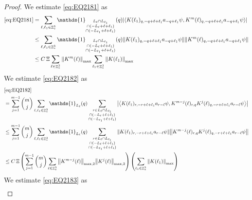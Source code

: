 \documentclass[sn-mathphys, Numbered ,a4paper]{sn-jnl}%
\DeclareMathOperator{\Z}{\mathbb{Z}}
\newcommand{\eva}[1]{\left\langle #1 \right\rangle}
\theoremstyle{plain}
\theoremstyle{definition}
\theoremstyle{remark}
\theoremstyle{plain}
\theoremstyle{definition}
\theoremstyle{remark}
\begin{document}
\begin{proof}
We estimate \eqref{eq:EQ2181} as 
\begin{align}
	 \eqref{eq:EQ2181}
	&= \sum\limits_{\ell, \ell_1\in \Z^3_*} \mathds{1}_{\substack{L_{\ell}\cap L_{\ell_1}\\\cap (-L_{\ell}+\ell+\ell_1) \\ \cap (-L_{\ell_1}+\ell+\ell_1)}}(q) \abs{\eva{ K(\ell_1)_{q,-q+\ell+\ell_1} a_{-q+\ell_1} \psi, K^m(\ell)_{q,-q+\ell+\ell_1} a_{-q+\ell_1} \psi }}\nonumber\\
	&\leq \sum\limits_{\ell, \ell_1\in \Z^3_*} \mathds{1}_{\substack{L_{\ell}\cap L_{\ell_1}\\\cap (-L_{\ell}+\ell+\ell_1) \\ \cap (-L_{\ell_1}+\ell+\ell_1)}}(q) \norm{ K(\ell_1)_{q,-q+\ell+\ell_1} a_{-q+\ell_1} \psi}\norm{ K^m(\ell)_{q,-q+\ell+\ell_1} a_{-q+\ell_1} \psi }\nonumber\\
	&\leq C\,\Xi \sum\limits_{\ell \in \Z^3_*} \norm{K^m(\ell)}_{\mathrm{max}} \sum\limits_{\ell_1 \in \Z^3_*} \norm{K(\ell_1)}_{\mathrm{max}}   \label{eq:estEQ2181}
\end{align}
We estimate \eqref{eq:EQ2182} as
\begin{align}
	& \eqref{eq:EQ2182}\nonumber\\
	&= \sum\limits_{j=1}^{m-1} {{m}\choose j} \sum\limits_{\ell, \ell_1\in \Z^3_*}\mathds{1}_{L_{\ell}}(q) \sum\limits_{\substack{r\in L_{\ell} \cap L_{\ell_1}\\\cap (-L_{\ell}+\ell+\ell_1) \\ \cap (-L_{\ell_1}+\ell+\ell_1)}}  \abs{\eva{ K(\ell_1)_{r,-r+\ell+\ell_1} a_{r-\ell} \psi, K^{m-j}(\ell)_{r,q} K^j(\ell)_{q,-r+\ell+\ell_1} a_{r-\ell} \psi }}\nonumber\\
	&\leq \sum\limits_{j=1}^{m-1} {{m}\choose j} \sum\limits_{\ell, \ell_1\in \Z^3_*}\mathds{1}_{L_{\ell}}(q) \sum\limits_{\substack{r\in L_{\ell} \cap L_{\ell_1}\\\cap (-L_{\ell}+\ell+\ell_1) \\ \cap (-L_{\ell_1}+\ell+\ell_1)}}  \norm{ K(\ell_1)_{r,-r+\ell+\ell_1} a_{r-\ell} \psi} \norm{ K^{m-j}(\ell)_{r,q} K^j(\ell)_{q,-r+\ell+\ell_1} a_{r-\ell} \psi} \nonumber\\
	&\leq C\,\Xi \left(\sum\limits_{j=1}^{m-1} {{m}\choose j} \sum\limits_{ \ell\in \Z^3_*} \norm{K^{m-j}(\ell)}_{\mathrm{max,2}} \norm{K^j(\ell)}_{\mathrm{max,2}}\right) \left(\sum\limits_{ \ell_1\in \Z^3_*}\norm{ K(\ell_1)}_{\mathrm{max}} \right) \label{eq:estEQ2182}
\end{align}
We estimate \eqref{eq:EQ2183} as
\begin{align}

\end{align}
\end{proof}
\end{document}
